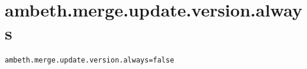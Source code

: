 \section{ambeth.merge.update.version.always}
\label{configuration:AmbethMergeUpdateVersionAlways}
\ClearAPI
\TODO
{}
\begin{lstlisting}[style=Props,caption={Usage example for \textit{ambeth.merge.update.version.always}}]
ambeth.merge.update.version.always=false
\end{lstlisting}